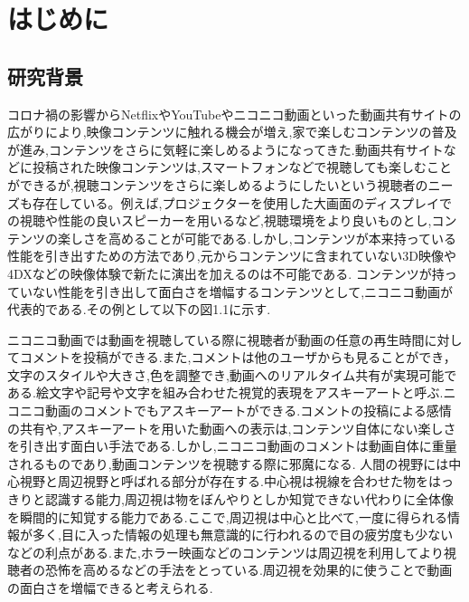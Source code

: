 \chapter{はじめに}
\thispagestyle{myheadings}

\section{研究背景}
コロナ禍の影響からNetflixやYouTubeやニコニコ動画といった動画共有サイトの広がりにより,映像コンテンツに触れる機会が増え,家で楽しむコンテンツの普及が進み,コンテンツをさらに気軽に楽しめるようになってきた.動画共有サイトなどに投稿された映像コンテンツは,スマートフォンなどで視聴しても楽しむことができるが,視聴コンテンツをさらに楽しめるようにしたいという視聴者のニーズも存在している。例えば,プロジェクターを使用した大画面のディスプレイでの視聴や性能の良いスピーカーを用いるなど,視聴環境をより良いものとし,コンテンツの楽しさを高めることが可能である.しかし,コンテンツが本来持っている性能を引き出すための方法であり,元からコンテンツに含まれていない3D映像や4DXなどの映像体験で新たに演出を加えるのは不可能である.
コンテンツが持っていない性能を引き出して面白さを増幅するコンテンツとして,ニコニコ動画が代表的である.その例として以下の図1.1に示す.

ニコニコ動画では動画を視聴している際に視聴者が動画の任意の再生時間に対してコメントを投稿ができる.また,コメントは他のユーザからも見ることができ，文字のスタイルや大きさ,色を調整でき,動画へのリアルタイム共有が実現可能である.絵文字や記号や文字を組み合わせた視覚的表現をアスキーアートと呼ぶ.ニコニコ動画のコメントでもアスキーアートができる.コメントの投稿による感情の共有や,アスキーアートを用いた動画への表示は,コンテンツ自体にない楽しさを引き出す面白い手法である.しかし,ニコニコ動画のコメントは動画自体に重量されるものであり,動画コンテンツを視聴する際に邪魔になる.
人間の視野には中心視野と周辺視野と呼ばれる部分が存在する.中心視は視線を合わせた物をはっきりと認識する能力,周辺視は物をぼんやりとしか知覚できない代わりに全体像を瞬間的に知覚する能力である.ここで,周辺視は中心と比べて,一度に得られる情報が多く,目に入った情報の処理も無意識的に行われるので目の疲労度も少ないなどの利点がある.また,ホラー映画などのコンテンツは周辺視を利用してより視聴者の恐怖を高めるなどの手法をとっている.周辺視を効果的に使うことで動画の面白さを増幅できると考えられる.



